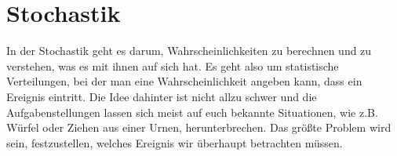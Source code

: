 \chapter{Stochastik}
In der Stochastik geht es darum, Wahrscheinlichkeiten zu berechnen und zu verstehen, was es mit ihnen auf sich hat. Es geht also um statistische Verteilungen, bei der man eine Wahrscheinlichkeit angeben kann, dass ein Ereignis eintritt. Die Idee dahinter ist nicht allzu schwer und die Aufgabenstellungen lassen sich meist auf euch bekannte Situationen, wie z.B. Würfel oder Ziehen aus einer Urnen, herunterbrechen. Das größte Problem wird sein, festzustellen, welches Ereignis wir überhaupt betrachten müssen.













